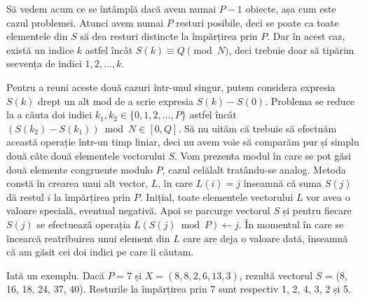 Să vedem acum ce se întâmplă dacă avem numai $P-1$ obiecte, așa cum este cazul
problemei. Atunci avem numai $P$ resturi posibile, deci se poate ca toate
elementele din $S$ să dea resturi distincte la împărțirea prin $P$. Dar în
acest caz, există un indice $k$ astfel încât $S(k) \equiv Q \pmod{N}$, deci
trebuie doar să tipărim secvența de indici $1, 2, \dots, k$.

Pentru a reuni aceste două cazuri într-unul singur, putem considera expresia
$S(k)$ drept un alt mod de a scrie expresia $S(k) - S(0)$. Problema se reduce
la a căuta doi indici $k_1, k_2 \in \{0, 1, 2, \dots, P\}$ astfel încât
$(S(k_2) - S(k_1)) \bmod N \in [0,Q]$. Să nu uităm că trebuie să efectuăm
această operație într-un timp liniar, deci nu avem voie să comparăm pur și
simplu două câte două elementele vectorului $S$. Vom prezenta modul în care se
pot găsi două elemente congruente modulo $P$, cazul celălalt tratându-se
analog. Metoda constă în crearea unui alt vector, $L$, în care $L(i) = j$
înseamnă că suma $S(j)$ dă restul $i$ la împărțirea prin $P$. Inițial, toate
elementele vectorului $L$ vor avea o valoare specială, eventual negativă. Apoi
se parcurge vectorul $S$ și pentru fiecare $S(j)$ se efectuează operația
$L(S(j) \bmod P) \leftarrow j$. În momentul în care se încearcă reatribuirea
unui element din $L$ care are deja o valoare dată, înseamnă că am găsit cei
doi indici pe care îi căutam.

Iată un exemplu. Dacă $P=7$ și $X=(8, 8, 2, 6, 13, 3)$, rezultă vectorul
$S$ = (8, 16, 18, 24, 37, 40). Resturile la împărțirea prin 7 sunt respectiv 1,
2, 4, 3, 2 și 5.


